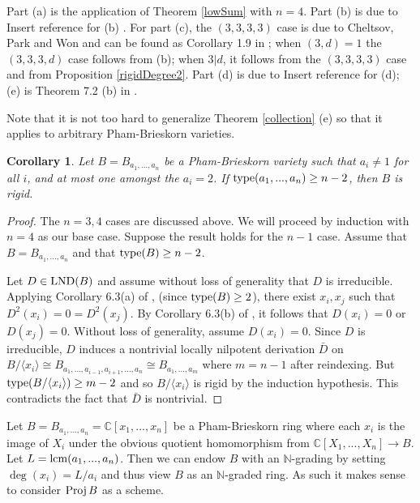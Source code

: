 \documentclass[12pt]{amsart}
\theoremstyle{plain}
\newcommand{\red}{\color{red}}
\newtheorem{corollary}[subsection]{Corollary}
\theoremstyle{definition}
\newcommand{\Proj}{		\operatorname{{\rm Proj}}}
\newcommand{\lcm}{		\operatorname{{\rm lcm}}}
\newcommand{\type}{		\operatorname{{\rm type}}}
\newcommand{\lb}{\langle}
\newcommand{\rb}{\rangle}
\newcommand{\Nat}{\ensuremath{\mathbb{N}}}
\newcommand{\Comp}{\ensuremath{\mathbb{C}}}
\newcommand{\lnd}{\operatorname{{\rm LND}}}
\newcommand{\isom}{\cong}
\begin{document}
Part (a) is the application of Theorem \ref{lowSum} with $n=4$. Part (b) is due to {\red Insert reference for (b) }. For part (c), the $(3,3,3,3)$ case is due to Cheltsov, Park and Won and can be found as Corollary 1.9 in \cite{affineCones}; when $(3,d) = 1$ the $(3,3,3,d)$ case follows from (b); when $3|d$, it follows from the $(3,3,3,3)$ case and from Proposition \ref{rigidDegree2}. Part (d) is due to {\red Insert reference for (d)}; (e) is Theorem 7.2 (b) in \cite{LNDsAbelianGroup}.

Note that it is not too hard to generalize Theorem \ref{collection} (e) so that it applies to arbitrary Pham-Brieskorn varieties. 

\begin{corollary}
	Let $B = B_{a_1,...,a_n}$ be a Pham-Brieskorn variety such that $a_i \neq 1$ for all $i$, and at most one amongst the $a_i = 2$. If $\type(a_1,...,a_n) \geq n-2$, then $B$ is rigid.  
\end{corollary}

\begin{proof}
	The $n = 3,4$ cases are discussed above. We will proceed by induction with $n=4$ as our base case. Suppose the result holds for the $n-1$ case. Assume that $B = B_{a_1, ..., a_n}$ and that $\type(B) \geq n-2$. 
	
	Let $D \in \lnd(B)$ and assume without loss of generality that $D$ is irreducible. Applying Corollary 6.3(a) of \cite{LNDsAbelianGroup}, (since $\type(B) \geq 2$), there exist $x_i,x_j$ such that $D^2(x_i) = 0 = D^2(x_j)$. By Corollary 6.3(b) of \cite{LNDsAbelianGroup}, it follows that $D(x_i) = 0$ or $D(x_j) = 0$. Without loss of generality, assume $D(x_i) = 0$. Since $D$ is irreducible, $D$ induces a nontrivial locally nilpotent derivation $\bar{D}$ on $B / \lb x_i \rb \isom B_{a_1,...,a_{i-1},a_{i+1},...,a_n} \isom B_{a_1,...,a_m}$ where $m = n-1$ after reindexing. But $\type(B / \lb x_i \rb) \geq m-2$ and so $B / \lb x_i \rb$ is rigid by the induction hypothesis. This contradicts the fact that $\bar{D}$ is nontrivial.        
\end{proof}

Let $B = B_{a_1, ..., a_n} = \Comp[x_1, ..., x_n]$ be a Pham-Brieskorn ring where each $x_i$ is the image of $X_i$ under the obvious quotient homomorphism from $\Comp[X_1,...,X_n] \to B$. Let $L = \lcm(a_1, ..., a_n)$. Then we can endow $B$ with an $\Nat$-grading by setting $\deg(x_i) = L/a_i$ and thus view $B$ as an $\Nat$-graded ring. As such it makes sense to consider $\Proj B$ as a scheme. 
\end{document}
